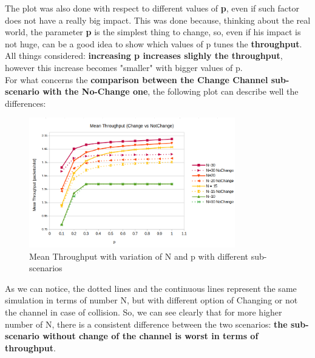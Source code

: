 The plot was also done with respect to different values of \textbf{p}, even if such factor does not have a really big impact. This was done because, thinking about the real world, the parameter \textbf{p} is the simplest thing to change, so, even if his impact is not huge, can be a good idea to show which values of p tunes the \textbf{throughput}. All things considered: \textbf{increasing p increases slighly the throughput}, however this increase becomes "smaller" with bigger values of p.\\
For what concerns the \textbf{comparison between the Change Channel sub-scenario with the No-Change one}, the following plot can describe well the differences:
\begin{figure}[H]
	\centering
	\includegraphics[width=0.8\textwidth]{img/MeanThroughputBufferExplosionChangeVSNoChange.png}
	\caption{Mean Throughput with variation of N and p with different sub-scenarios}
	\label{img: insight3_respTime}
\end{figure}
As we can notice, the dotted lines and the continuous lines represent the same simulation in terms of number N, but with different option of Changing or not the channel in case of collision. So, we can see clearly that for more higher number of N, there is a consistent difference between the two scenarios: \textbf{the sub-scenario without change of the channel is worst in terms of throughput}.